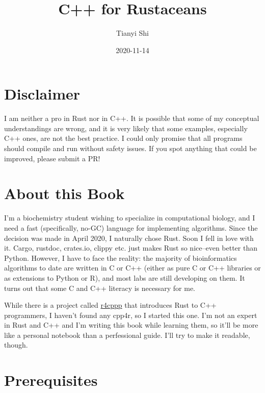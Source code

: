 \documentclass[
]{book}
\title{C++ for Rustaceans}
\author{Tianyi Shi}
\date{2020-11-14}
\begin{document}
\maketitle

{
\setcounter{tocdepth}{1}
\tableofcontents
}
\hypertarget{disclaimer}{%
\chapter*{Disclaimer}\label{disclaimer}}

I am neither a pro in Rust nor in C++. It is possible that some of my conceptual understandings are wrong, and it is very likely that some examples, especially C++ ones, are not the best practice. I could only promise that all programs should compile and run without safety issues. If you spot anything that could be improved, please submit a PR!

\hypertarget{about-this-book}{%
\chapter*{About this Book}\label{about-this-book}}

I'm a biochemistry student wishing to specialize in computational biology, and I need a fast (specifically, no-GC) language for implementing algorithms. Since the decision was made in April 2020, I naturally chose Rust. Soon I fell in love with it. Cargo, rustdoc, crates.io, clippy etc. just makes Rust so nice--even better than Python. However, I have to face the reality: the majority of bioinformatics algorithms to date are written in C or C++ (either as pure C or C++ libraries or as extensions to Python or R), and most labs are still developing on them. It turns out that some C and C++ literacy is necessary for me.

While there is a project called \href{https://github.com/nrc/r4cppp}{r4cppp} that introduces Rust to C++ programmers, I haven't found any cpp4r, so I started this one. I'm not an expert in Rust and C++ and I'm writing this book while learning them, so it'll be more like a personal notebook than a perfessional guide. I'll try to make it readable, though.

\hypertarget{prerequisites}{%
\chapter*{Prerequisites}\label{prerequisites}}
\end{document}
